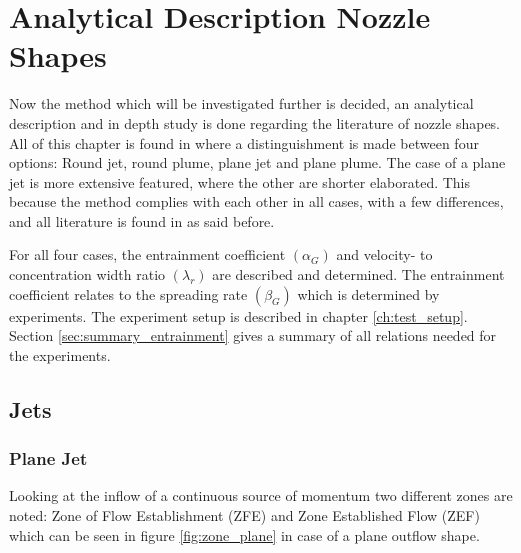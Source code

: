 \chapter{Analytical Description Nozzle Shapes}
\label{ch:Analytical}

\noindent Now the method which will be investigated further is decided, an analytical description and in depth study is done regarding the literature of nozzle shapes. All of this chapter is found in \cite{Lee+} where a distinguishment is made between four options: Round jet, round plume, plane jet and plane plume. The case of a plane jet is more extensive featured, where the other are shorter elaborated. This because the method complies with each other in all cases, with a few differences, and all literature is found in \cite{Lee+} as said before. \newline 

\noindent For all four cases, the entrainment coefficient $(\alpha_G)$ and velocity- to concentration width ratio $(\lambda_r)$ are described and determined. The entrainment coefficient relates to the spreading rate $(\beta_G)$ which is determined by experiments. The experiment setup is described in chapter \ref{ch:test_setup}. Section \ref{sec:summary_entrainment} gives a summary of all relations needed for the experiments.


\newpage
\section{Jets}
\label{sec:planejet}




\subsection{Plane Jet}

Looking at the inflow of a continuous source of momentum two different zones are noted: Zone of Flow Establishment (ZFE) and Zone Established Flow (ZEF) which can be seen in figure \ref{fig:zone_plane} in case of a plane outflow shape. 



